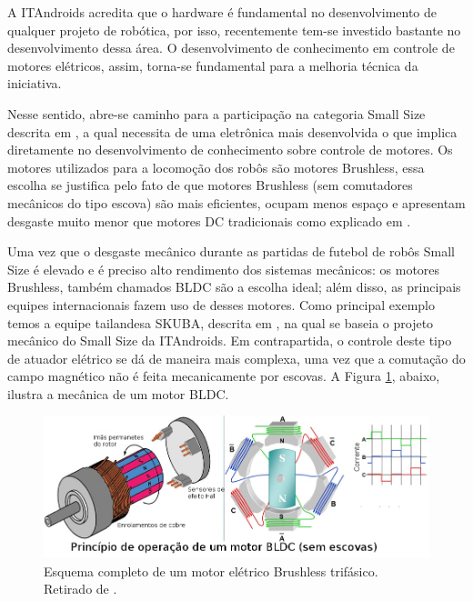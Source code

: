 \documentclass[10pt,fleqn,a4paper]{article}
\begin{document}
    A ITAndroids acredita que o hardware é fundamental no desenvolvimento de qualquer projeto de robótica, por isso, recentemente tem-se investido bastante no desenvolvimento dessa área. O desenvolvimento de conhecimento em controle de motores elétricos, assim, torna-se fundamental para a melhoria técnica da iniciativa.
    
    Nesse sentido, abre-se caminho para a participação na categoria Small Size descrita em \cite{robocupregras}, a qual necessita de uma eletrônica mais desenvolvida o que implica diretamente no desenvolvimento de conhecimento sobre controle de motores. Os motores utilizados para a locomoção dos robôs são motores Brushless, essa escolha se justifica pelo fato de que motores Brushless (sem comutadores mecânicos do tipo escova) são mais eficientes, ocupam menos espaço e apresentam desgaste muito menor que motores DC tradicionais como explicado em \cite{introducaobldc}.
    
    Uma vez que o desgaste mecânico durante as partidas de futebol de robôs Small Size é elevado e é preciso alto rendimento dos sistemas mecânicos: os motores Brushless, também chamados BLDC são a escolha ideal; além disso, as principais equipes internacionais fazem uso de desses motores. Como principal exemplo temos a equipe tailandesa SKUBA, descrita em \cite{skuba}, na qual se baseia o projeto mecânico do Small Size da ITAndroids. Em contrapartida, o controle deste tipo de atuador elétrico se dá de maneira mais complexa, uma vez que a comutação do campo magnético não é feita mecanicamente por escovas. A Figura \ref{fig:esquemamotor}, abaixo, ilustra a mecânica de um motor BLDC.

	\begin{figure}[ht]
		\begin{center}
			\includegraphics[angle=0, scale=0.4]{images/4-Pole-brushless-DC-motor-animation.png}
		\end{center}
		\caption{Esquema completo de um motor elétrico Brushless trifásico. Retirado de \cite{figuramotor}.}
		\label{fig:esquemamotor}
	\end{figure}
    
\end{document}
